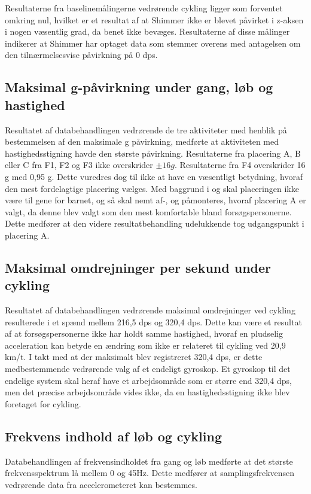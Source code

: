 Resultaterne fra baselinemålingerne vedrørende cykling ligger som forventet omkring nul, hvilket er et resultat af at Shimmer ikke er blevet påvirket i z-aksen i nogen væsentlig grad, da benet ikke bevæges. Resultaterne af disse målinger indikerer at Shimmer har optaget data som stemmer overens med antagelsen om den tilnærmelsesvise påvirkning på 0 dps. 

\subsection{Maksimal g-påvirkning under gang, løb og hastighed} \label{app:maxg}
Resultatet af databehandlingen vedrørende de tre aktiviteter med henblik på bestemmelsen af den maksimale g påvirkning, medførte at aktiviteten med hastighedsstigning havde den største påvirkning. Resultaterne fra placering A, B eller C fra F1, F2 og F3 ikke overskrider $\pm 16g$. Resultaterne fra F4 overskrider 16 g med 0,95 g. Dette vuredres dog til ikke at have en væsentligt betydning, hvoraf den mest fordelagtige placering vælges. Med baggrund i  og  skal placeringen ikke være til gene for barnet, og så skal nemt af-, og påmonteres, hvoraf placering A er valgt, da denne blev valgt som den mest komfortable bland forsøgspersonerne. Dette medfører at den videre resultatbehandling udelukkende tog udgangspunkt i placering A. 

\subsection{Maksimal omdrejninger per sekund under cykling}
Resultatet af databehandlingen vedrørende maksimal omdrejninger ved cykling resulterede i et spænd mellem 216,5 dps og 320,4 dps. Dette kan være et resultat af at forsøgspersonerne ikke har holdt samme hastighed, hvoraf en pludselig acceleration kan betyde en ændring som ikke er relateret til cykling ved 20,9 km/t. I takt med at der maksimalt blev registreret 320,4 dps, er dette medbestemmende vedrørende valg af et endeligt gyroskop. Et gyroskop til det endelige system skal heraf have et arbejdsområde som er større end 320,4 dps, men det præcise arbejdsområde vides ikke, da en hastighedsstigning ikke blev foretaget for cykling.

\subsection{Frekvens indhold af løb og cykling}
Databehandlingen af frekvensindholdet fra gang og løb medførte at det største frekvensspektrum lå mellem 0 og 45Hz. Dette medfører at samplingsfrekvensen vedrørende data fra accelerometeret kan bestemmes. 

